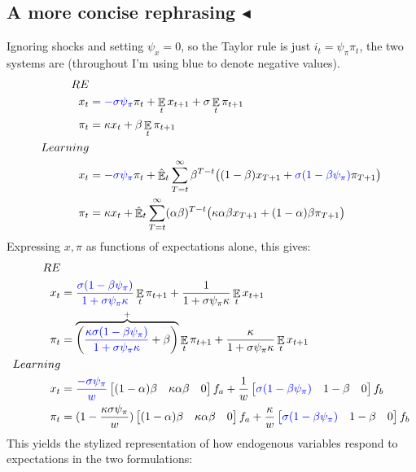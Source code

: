 \documentclass[11pt]{article}
\renewcommand{\[}{\begin{equation}}
\renewcommand{\]}{\end{equation}}
\DeclareMathOperator{\E}{\mathbb{E}}
\begin{document}
\subsection{A more concise rephrasing $\blacktriangleleft$}
Ignoring shocks and setting $\psi_x = 0$, so the Taylor rule is just $i_t =  \psi_{\pi}\pi_t$, the two systems are
(throughout I'm using blue to denote negative values).
\begin{align*}
RE& \\
x_t &= \textcolor{blue}{- \sigma \psi_{\pi}} \pi_t+  \E_t x_{t+1}   + \sigma \E_t \pi_{t+1}  \\
\pi_t &= \kappa x_t +\beta \E_t \pi_{t+1} \\
Learning & \\
x_t &= \textcolor{blue}{ -\sigma \psi_{\pi}} \pi_t +\hat{\E}_t \sum_{T=t}^{\infty} \beta^{T-t }\big( (1-\beta) x_{T+1} + \textcolor{blue}{\sigma(1- \beta \psi_{\pi})}\pi_{T+1} \big)  \\
\pi_t &= \kappa x_t +\hat{\E}_t \sum_{T=t}^{\infty} (\alpha\beta)^{T-t }\big( \kappa \alpha \beta x_{T+1} + (1-\alpha)\beta \pi_{T+1} \big)
\end{align*}
Expressing $x, \pi$ as functions of expectations alone, this gives:
\begin{align*}
RE& \\
x_t &=  \textcolor{blue}{ \frac{\sigma(1-\beta\psi_{\pi})}{1+\sigma\psi_{\pi}\kappa}}\E_t \pi_{t+1}   +   \frac{1}{1+\sigma\psi_{\pi}\kappa}\E_t x_{t+1}  \\
\pi_t &=   \overbrace{\bigg( \textcolor{blue}{\frac{\kappa\sigma(1-\beta\psi_{\pi})}{1+\sigma\psi_{\pi}\kappa}}+\beta\bigg)}^{+}\E_t \pi_{t+1} +   \frac{\kappa}{1+\sigma\psi_{\pi}\kappa}\E_t x_{t+1} \\
Learning & \\
x_t & = \textcolor{blue}{\frac{-\sigma\psi_{\pi}}{w}} \begin{bmatrix} (1-\alpha)\beta&\kappa\alpha\beta & 0 \end{bmatrix} f_a + \frac{1}{w}\begin{bmatrix} \textcolor{blue}{\sigma(1-\beta\psi_{\pi})}&1-\beta & 0\end{bmatrix} f_b \\
\pi_t & = (1-\frac{\kappa\sigma\psi_{\pi}}{w}) \begin{bmatrix} (1-\alpha)\beta&\kappa\alpha\beta & 0 \end{bmatrix} f_a + \frac{\kappa}{w}\begin{bmatrix}  \textcolor{blue}{\sigma(1-\beta\psi_{\pi})}&1-\beta & 0\end{bmatrix} f_b
\end{align*}
This yields the stylized representation of how endogenous variables respond to expectations in the two formulations:
\end{document}
